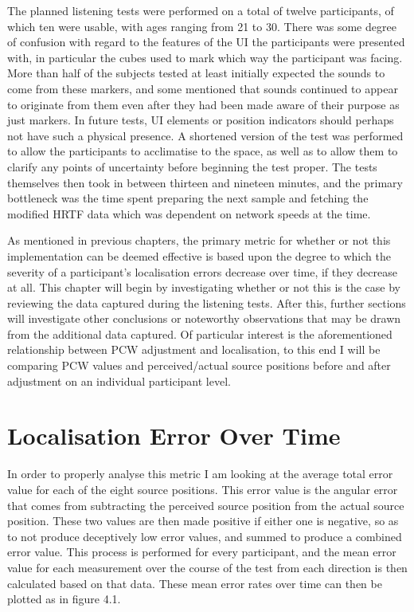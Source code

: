 The planned listening tests were performed on a total of twelve participants, of which ten were usable, with ages ranging from 21 to 30. There was some degree of confusion with regard to the features of the UI the participants were presented with, in particular the cubes used to mark which way the participant was facing. More than half of the subjects tested at least initially expected the sounds to come from these markers, and some mentioned that sounds continued to appear to originate from them even after they had been made aware of their purpose as just markers. In future tests, UI elements or position indicators should perhaps not have such a physical presence. A shortened version of the test was performed to allow the participants to acclimatise to the space, as well as to allow them to clarify any points of uncertainty before beginning the test proper. The tests themselves then took in between thirteen and nineteen minutes, and the primary bottleneck was the time spent preparing the next sample and fetching the modified HRTF data which was dependent on network speeds at the time. 

As mentioned in previous chapters, the primary metric for whether or not this implementation can be deemed effective is based upon the degree to which the severity of a participant's localisation errors decrease over time, if they decrease at all. This chapter will begin by investigating whether or not this is the case by reviewing the data captured during the listening tests. After this, further sections will investigate other conclusions or noteworthy observations that may be drawn from the additional data captured. Of particular interest is the aforementioned relationship between PCW adjustment and localisation, to this end I will be comparing PCW values and perceived/actual source positions before and after adjustment on an individual participant level.

\section{Localisation Error Over Time}
In order to properly analyse this metric I am looking at the average total error value for each of the eight source positions. This error value is the angular error that comes from subtracting the perceived source position from the actual source position. These two values are then made positive if either one is negative, so as to not produce deceptively low error values, and summed to produce a combined error value. This process is performed for every participant, and the mean error value for each measurement over the course of the test from each direction is then calculated based on that data. These mean error rates over time can then be plotted as in figure 4.1. 

